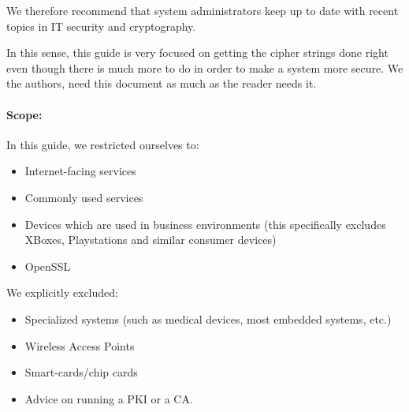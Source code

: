 We therefore recommend that system administrators keep up to date with recent
topics in IT security and cryptography. 


In this sense, this guide is very focused on getting the cipher strings done
right even though there is much more to do in order to make a system more
secure.  We the authors, need this document as much as the reader needs it.

\paragraph{Scope:}
\label{section:Scope}

In this guide, we restricted ourselves to:
\begin{itemize}
\item Internet-facing services
\item Commonly used services
\item Devices which are used in business environments (this specifically excludes XBoxes, Playstations and similar consumer devices)
\item OpenSSL 
\end{itemize}

We explicitly excluded:
\begin{itemize}
\item Specialized systems (such as medical devices, most embedded systems, etc.)
\item Wireless Access Points
\item Smart-cards/chip cards
\item Advice on running a PKI or a CA.
\end{itemize}

